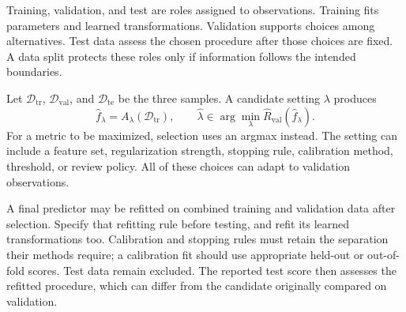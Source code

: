 Training, validation, and test are roles assigned to observations. Training fits parameters and learned transformations. Validation supports choices among alternatives. Test data assess the chosen procedure after those choices are fixed. A data split protects these roles only if information follows the intended boundaries.

Let $\mathcal D_{\mathrm{tr}}$, $\mathcal D_{\mathrm{val}}$, and $\mathcal D_{\mathrm{te}}$ be the three samples. A candidate setting $\lambda$ produces
\[
\hat f_\lambda=A_\lambda(\mathcal D_{\mathrm{tr}}),
\qquad
\hat\lambda\in\arg\min_\lambda
\hat R_{\mathrm{val}}(\hat f_\lambda).
\]
For a metric to be maximized, selection uses an argmax instead. The setting can include a feature set, regularization strength, stopping rule, calibration method, threshold, or review policy. All of these choices can adapt to validation observations.

\par\addvspace{\intextsep}\noindent\begin{minipage}{\linewidth}
\centering
{}
\label{fig:evaluation-workflow}
\end{minipage}\par\addvspace{\intextsep}

A final predictor may be refitted on combined training and validation data after selection. Specify that refitting rule before testing, and refit its learned transformations too. Calibration and stopping rules must retain the separation their methods require; a calibration fit should use appropriate held-out or out-of-fold scores. Test data remain excluded. The reported test score then assesses the refitted procedure, which can differ from the candidate originally compared on validation.

